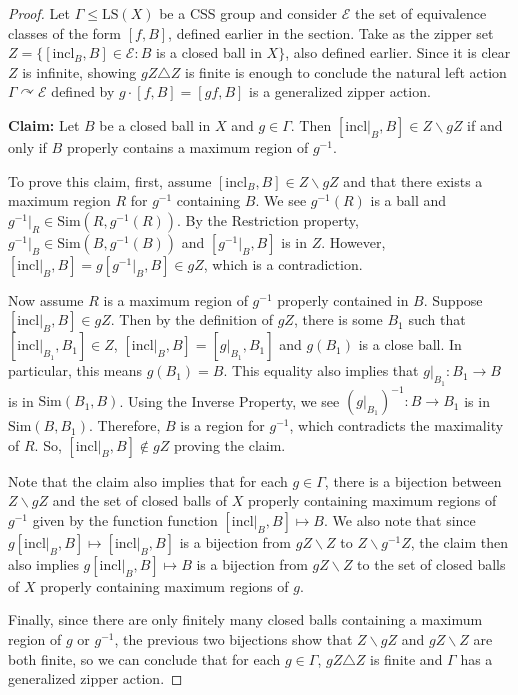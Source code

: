 \documentclass[12pt]{amsart}
\numberwithin{equation}{subsection}
\theoremstyle{definition}
\theoremstyle{definition}
\theoremstyle{remark}
\begin{document}
\begin{proof}

 Let $\Gamma \leq \text{LS}(X)$ be a CSS group and consider $\mathcal E$ the set of equivalence classes of the form $[f,B]$, defined earlier in the section. Take as the zipper set $Z= \{ [\text{incl}_B,B] \in  \mathcal E : B$ is a closed ball in $X\}$, also defined earlier. Since it is clear $Z$ is infinite, showing $gZ \triangle Z$ is finite is enough to conclude the natural left action $\Gamma \curvearrowright \mathcal E$ defined by $g \cdot [f,B] = [gf,B]$ is a generalized zipper action. 


\noindent \textbf{Claim:} 
Let $B$ be a closed ball in $X$ and $g \in \Gamma$. Then $[\text{incl}\vert_B, B] \in Z \backslash gZ$ if and only if $B$ properly contains a maximum region of $g^{-1}$.

  To prove this claim, first, assume $[\text{incl}_B,B] \in Z \backslash gZ$ and that there exists a maximum region $R$ for $g^{-1}$ containing $B$. We see $g^{-1}(R)$ is a ball and $g^{-1}\vert_R \in  \text{Sim}(R, g^{-1}(R))$. By the Restriction property, $g^{-1}\vert_B \in \text{Sim}(B, g^{-1}(B))$ and $[g^{-1}\vert_B,B]$ is in $Z$. However, $[\text{incl}\vert_B,B] = g[g^{-1}\vert_B,B] \in gZ$, which is a contradiction. 

  Now assume $R$ is a maximum region of $g^{-1}$ properly contained in $B$. Suppose  $[\text{incl}\vert_B,B] \in gZ$. Then by the definition of $gZ$, there is some $B_1$ such that $[\text{incl}\vert_{B_1},B_1] \in Z$, $[\text{incl}\vert_B,B] = [g\vert_{B_1},B_1]$ and $g(B_1)$ is a close ball. In particular, this means $g(B_1) =B$. This equality also implies that $g\vert_{B_1} : B_1 \rightarrow B$ is in  $\text{Sim}(B_1, B)$. Using the Inverse Property, we see $(g\vert_{B_1})^{-1} : B \rightarrow B_1$ is in  $\text{Sim}(B, B_1).$ Therefore, $B$ is a region for $g^{-1}$, which contradicts the maximality of $R$. So,  $[\text{incl}\vert_B,B] \not \in gZ$ proving the claim.

Note that the claim also implies that for each $g \in \Gamma$, there is a bijection between $Z \backslash gZ$ and the set of closed balls of $X$ properly containing maximum regions of $g^{-1}$ given by the function function $[\text{incl}\vert_B, B] \mapsto B$. We also note that since $g[\text{incl}\vert_B, B] \mapsto [\text{incl}\vert_B, B]$ is a bijection from $gZ \backslash Z$ to $Z \backslash g^{-1}Z$, the claim then also implies $g[\text{incl}\vert_B, B] \mapsto B$ is a bijection from $gZ \backslash Z$ to the set of closed balls of $X$ properly containing maximum regions of $g$.



Finally, since there are only finitely many closed balls containing a maximum region of $g$ or $g^{-1}$, the previous two bijections show that $Z \backslash gZ$ and $gZ \backslash Z$ are both finite, so we can conclude that for each $g \in \Gamma$, $gZ \triangle Z$ is finite and $\Gamma$ has a generalized zipper action. 




\end{proof}
\end{document}
